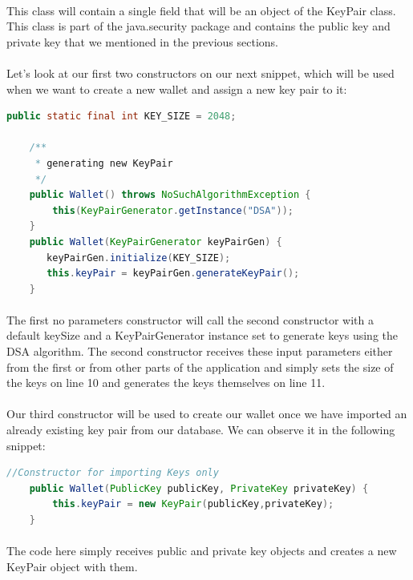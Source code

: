 \documentclass[12pt,a4paper]{report}
\begin{document}
\paragraph{}
This class will contain a single field that will be an object of the KeyPair class. This class is part of the java.security package and contains the public key and private key that we mentioned in the previous sections.
\paragraph{}
Let’s look at our first two constructors on our next snippet, which will be used when we want to create a new wallet and assign a new key pair to it:

 \begin{lstlisting}[language=Java]
    public static final int KEY_SIZE = 2048;

    /**
     * generating new KeyPair
     */
    public Wallet() throws NoSuchAlgorithmException {
        this(KeyPairGenerator.getInstance("DSA"));
    }
    public Wallet(KeyPairGenerator keyPairGen) {
       keyPairGen.initialize(KEY_SIZE);
       this.keyPair = keyPairGen.generateKeyPair();
    }
\end{lstlisting}
\paragraph{}
 The first no parameters constructor will call the second constructor 
with a default keySize and a KeyPairGenerator instance set to generate 
keys using the DSA algorithm. The second constructor receives these input 
parameters either from the first or from other parts of the application 
and simply sets the size of the keys on line 10 and generates the keys 
themselves on line 11.
\paragraph{}
Our third constructor will be used to create our wallet once we have imported an already existing key pair from our database. We can observe it in the following snippet:
\begin{lstlisting}[language=Java]
    //Constructor for importing Keys only
    public Wallet(PublicKey publicKey, PrivateKey privateKey) {
        this.keyPair = new KeyPair(publicKey,privateKey);
    }
\end{lstlisting}
\paragraph{}
The code here simply receives public and private key objects and creates a new KeyPair object with them.
\end{document}
